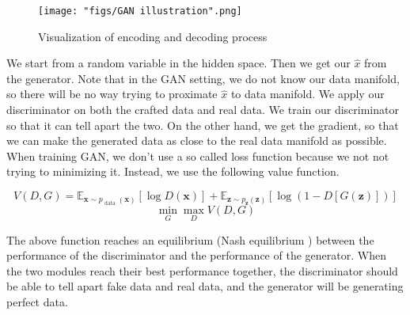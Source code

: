 \begin{figure}
    \centering
    \texttt{[image: "figs/GAN illustration".png]}
    \caption{Visualization of encoding and decoding process}
    \label{fig:enc_dec_process}
\end{figure}

We start from a random variable in the hidden space. Then we get our $\hat{x}$ from the generator. Note that in the GAN setting, we do not know our data manifold, so there will be no way trying to proximate $\hat{x}$ to data manifold. We apply our discriminator on both the crafted data and real data. We train our discriminator so that it can tell apart the two. On the other hand, we get the gradient, so that we can make the generated data as close to the real data manifold as possible. \\


When training GAN, we don't use a so called loss function because we not not trying to minimizing it. Instead, we use the following value function.

$$V(D, G)=\mathbb{E}_{\boldsymbol{x} \sim p_{\text { data }}(\boldsymbol{x})}[\log D(\boldsymbol{x})]+\mathbb{E}_{\boldsymbol{z} \sim p_{\boldsymbol{z}}(\boldsymbol{z})}[\log (1-D[G(\boldsymbol{z})])]$$
$$\min _{G} \max _{D} V(D, G)$$

The above function reaches an equilibrium (Nash equilibrium ) between the performance of the discriminator and the performance of the generator. When the two modules reach their best performance together, the discriminator should be able to tell apart fake data and real data, and the generator will be generating perfect data.
